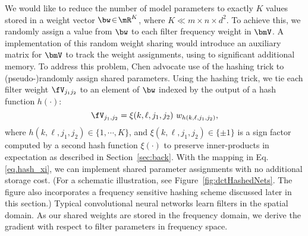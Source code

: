 \documentclass{article} %
\begin{document}
We would like to reduce the number of model parameters to exactly $K$ values stored in a weight vector $\bw \!\in\!\mR^{K}$, where $K \ll m\times n\times d^2$.
To achieve this, we randomly assign a value from $\bw$ to each filter frequency weight in $\bmV$.
A \naive{} implementation of this random weight sharing would introduce an auxiliary matrix for $\bmV$ to track the weight assignments, using to significant additional memory.
To address this problem, Chen \etal{}\cite{chen2015compressing} advocate use of the hashing trick to (pseudo-)randomly assign shared parameters.
Using the hashing trick, we tie each filter weight $\fV_{j_1 j_2}$ to an element of $\bw$ indexed by the output of a hash function $h(\cdot)$:
\begin{equation}
	\fV_{j_1,j_2} = \xi(k, \ell, j_1,j_2)\ w_{h(k, \ell, j_1,j_2 )},
	\label{eq.hash_xi}
\end{equation}
where $h(k, \ell, j_1,j_2)\!\in\!\{1,\cdots,K\}$, and $\xi(k, \ell, j_1,j_2)\!\in\!\{\pm 1\}$ is a sign factor computed by a second hash function $\xi(\cdot)$ to preserve inner-products in expectation as described in Section~\ref{sec:back}.
With the mapping in Eq. \eqref{eq.hash_xi}, we can implement shared parameter assignments with no additional storage cost. (For a schematic illustration, see Figure~\ref{fig:dctHashedNets}. The figure also incorporates a frequency sensitive hashing scheme discussed later in this section.)
Typical convolutional neural networks learn filters in the spatial domain. As our shared weights are stored in the frequency domain, we derive the gradient with respect to filter parameters in frequency space.
\end{document}
